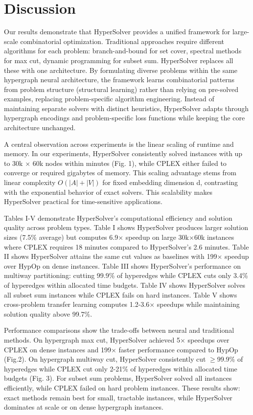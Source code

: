 \documentclass[conference]{IEEEtran}
\begin{document}
\section{Discussion}
Our results demonstrate that HyperSolver provides a unified framework for large-scale combinatorial optimization. Traditional approaches require different algorithms for each problem: branch-and-bound for set cover, spectral methods for max cut, dynamic programming for subset sum. HyperSolver replaces all these with one architecture. By formulating diverse problems within the same hypergraph neural architecture, the framework learns combinatorial patterns from problem structure (structural learning) rather than relying on pre-solved examples, replacing problem-specific algorithm engineering. Instead of maintaining separate solvers with distinct heuristics, HyperSolver adapts through hypergraph encodings and problem-specific loss functions while keeping the core architecture unchanged.

A central observation across experiments is the linear scaling of runtime and memory. In our experiments, HyperSolver consistently solved instances with up to 30k \(\times\) 60k nodes within minutes (Fig. 1), while CPLEX either failed to converge or required gigabytes of memory. This scaling advantage stems from linear complexity \(O(|A| + |V|)\) for fixed embedding dimension d, contrasting with the exponential behavior of exact solvers. This scalability makes HyperSolver practical for time-sensitive applications.

Tables I-V demonstrate HyperSolver's computational efficiency and solution quality across problem types. Table I shows HyperSolver produces larger solution sizes (7.5\% average) but computes 6.9\(\times\) speedup on large 30k\(\times\)60k instances where CPLEX requires 18 minutes compared to HyperSolver's 2.6 minutes. Table II shows HyperSolver attains the same cut values as baselines with 199\(\times\) speedup over HypOp on dense instances. Table III shows HyperSolver's performance on multiway partitioning: cutting 99.9\% of hyperedges while CPLEX cuts only 3.4\% of hyperedges within allocated time budgets. Table IV shows HyperSolver solves all subset sum instances while CPLEX fails on hard instances. Table V shows cross-problem transfer learning computes 1.2-3.6\(\times\) speedups while maintaining solution quality above 99.7\%.

Performance comparisons show the trade-offs between neural and traditional methods. On hypergraph max cut, HyperSolver achieved 5\(\times\) speedups over CPLEX on dense instances and 199\(\times\) faster performance compared to HypOp (Fig.2). On hypergraph multiway cut, HyperSolver consistently cut \(\geq\)99.9\% of hyperedges while CPLEX cut only 2-21\% of hyperedges within allocated time budgets (Fig. 3). For subset sum problems, HyperSolver solved all instances efficiently, while CPLEX failed on hard problem instances. These results show: exact methods remain best for small, tractable instances, while HyperSolver dominates at scale or on dense hypergraph instances.
\end{document}
